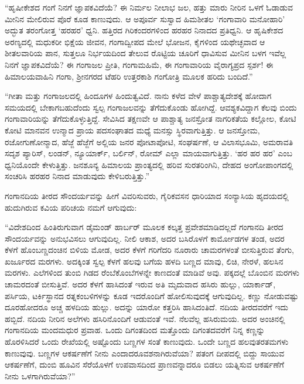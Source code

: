  “ಹೃಷೀಕೇಶದ ಗಂಗೆ ನಿನಗೆ ಜ್ಞಾಪಕವಿದೆಯೆ? ಈ ನಿರ್ಮಲ ನೀಲಾಭ ಜಲ, ಹತ್ತು ಮಾರು ನೀರಿನ ಒಳಗೆ ಓಡಾಡುವ ಮೀನಿನ ಮೇಲಿರುವ ಪೊರೆ ಕೂಡ ಕಾಣುವುದು. ಆ ಅಪೂರ್ವ ಸುಸ್ವಾದ ಹಿಮಶೀತಲ ‘ಗಂಗಾವಾರಿ ಮನೋಹಾರಿ’ ಅದ್ಭುತ ತರಂಗೋತ್ತ ‘ಹರಹರ’ ಧ್ವನಿ. ಹತ್ತಿರದ ಗಿರಿಕಂದರಗಳಿಂದ ಹರಹರ ನಿನಾದದ ಪ್ರತಿಧ್ವನಿ. ಆ ಹೃಷಿಕೇಶದ ಅರಣ್ಯದಲ್ಲಿ ಮಧುಕರೀ ಭಿಕ್ಷೆಯ ಜೀವನ, ಗಂಗಾದ್ವೀಪದ ಮೇಲೆ ಭೋಜನ, ಕೈಗಳಿಂದ ಯಥೇಚ್ಛವಾದ ಆ ಶೀತಲವಾರಿಯ ಪಾನ, ಸುತ್ತಲೂ ನಿರ್ಭಯದಿಂದ ತೇಲುವ ರೊಟ್ಟಿಯ ಚೂರಿಗೆ ಧಾವಿಸುವ ಮೀನಿನ ಬಳಗ ಇವೆಲ್ಲ ನಿನಗೆ ಜ್ಞಾಪಕವಿದೆಯೆ? ಈ ಗಂಗಾಜಲ ಪ್ರೀತಿ, ಗಂಗಾಮಹಿಮೆ, ಈ ಗಂಗಾವಾರಿಯ ವೈರಾಗ್ಯಪ್ರದ ಸ್ಪರ್ಶ! ಈ ಹಿಮಾಲಯವಾಹಿನಿ ಗಂಗಾ, ಶ‍್ರೀನಗರದ ಟೆಹರಿ ಉತ್ತರಕಾಶಿ ಗಂಗೋತ್ರಿ ಮೂಲಕ ಹರಿದು ಬಂದಿದೆ.” 

 “ಗೀತಾ ಮತ್ತು ಗಂಗಾಜಲದಲ್ಲಿ ಹಿಂದೂಗಳ ಹಿಂದುತ್ವವಿದೆ. ನಾನು ಕಳೆದ ವೇಳೆ ಪಾಶ್ಚಾತ್ಯದೇಶಕ್ಕೆ ಹೋದಾಗ ಸಮಯದಲ್ಲಿ ಬೇಕಾಗಬಹುದೆಂದು ಸ್ವಲ್ಪ ಗಂಗಾಜಲವನ್ನು ತೆಗೆದುಕೊಂಡು ಹೋಗಿದ್ದೆ. ಆವಶ್ಯಕವಿದ್ದಾಗ ಕೆಲವು ಬಿಂದು ಗಂಗಾವಾರಿಯನ್ನು ತೆಗೆದುಕೊಳ್ಳುತ್ತಿದ್ದೆ. ಸೇವಿಸಿದ ತಕ್ಷಣವೇ ಆ ಪಾಶ್ಚಾತ್ಯ ಜನಸ್ರೋತ ನಾಗರಿಕತೆಯ ಕಲ್ಲೋಲ, ಕೋಟಿ ಕೋಟಿ ಮಾನವನ ಉನ್ಮಾದ ಪ್ರಾಯ ಪದಸಂಘಾತದ ಮಧ್ಯೆ ಮನಸ್ಸು ಸ್ಥಿರವಾಗುತ್ತಿತ್ತು. ಆ ಜನಸ್ತೋಮ, ರಜೋಗುಣೋನ್ಮಾದ, ಹೆಜ್ಜೆ ಹೆಜ್ಜೆಗೆ ಅಲ್ಲಿಯ ಜನರ ಪೋಟಾಪೋಟಿ, ಸಂಘರ್ಷಣೆ, ಆ ವಿಲಾಸಭೂಮಿ, ಅಮರಾವತಿ ಸದೃಶ ಪ್ಯಾರಿಸ್, ಲಂಡನ್, ನ್ಯೂಯಾರ್ಕ್, ಬರ್ಲಿನ್, ರೋಮ್ ಎಲ್ಲಾ ಮಾಯವಾಗುತ್ತಿತ್ತು. ‘ಹರ ಹರ ಹರ’ ಎಂಬ ಧ್ವನಿಯೊಂದೇ ಕೇಳುತ್ತಿತ್ತು. ಜನಶೂನ್ಯ ಹಿಮಾಲಯ ಪ್ರಾಂತ್ಯದಲ್ಲಿ ಹರಿವ ಸುರತರಿಂಗಿನಿ, ದೇಹದ ಅಂಗೋಪಾಂಗದಲ್ಲಿ ಸಂಚರಿಸಿ ಹರಹರ ನಿನಾದ ಮಾಡುವುದು ಕೇಳಿಬರುತ್ತಿತ್ತು.” 

 ಗಂಗಾನದಿಯ ತೀರದ ಸೌಂದರ್ಯವನ್ನು ಹೀಗೆ ವಿವರಿಸುವರು, ಗೈರಿಕವಸನ ಧಾರಿಯಾದ ಸಂನ್ಯಾಸಿಯ ಹೃದಯದಲ್ಲಿ ಹುದುಗಿರುವ ಕವಿಯ ಪರಿಚಯ ನಮಗೆ ಆಗುವುದು: 

 “ವಿದೇಶದಿಂದ ಹಿಂತಿರುಗುವಾಗ ಡೈಮಂಡ್ ಹಾರ್ಬರ್ ಮೂಲಕ ಕಲ್ಕತ್ತ ಪ್ರವೇಶಮಾಡಿದಲ್ಲದೆ ಗಂಗಾನದಿ ತೀರದ ಸೌಂದರ್ಯವನ್ನು ಅನುಭವಿಸಲು ಆಗುವುದಿಲ್ಲ. ನೀಲಿ ಆಕಾಶ, ಅದರ ಬಸಿರೊಳಗೆ ಕಾರ್ಮೋಡಗಳ ತಂಡ, ಅದರ ಕೆಳಗೆ ಹೊಂಬಣ್ಣದಂಚಿನ ಬಿಳಿಯ ಮೋಡ, ಅದರ ಕೆಳಗೆ ಗರಿಗೆದರಿ ನೂರಾರು ಚಾಮರಗಳಂತೆ ಬೀಸುತ್ತಿರುವ ತೆಂಗು, ಖರ್ಜೂರದ ಮರಗಳು. ಅದಕ್ಕಿಂತ ಸ್ವಲ್ಪ ಕೆಳಗೆ ಹಲವು ಬಗೆಯ ಹಳದಿ ಬಣ್ಣದ ಮಾವು, ಲಿಚಿ, ನೇರಳೆ, ಹಲಸಿನ ಮರಗಳು. ಎಲೆಗಳಿಂದ ತುಂಬಿ ಗಿಡದ ರೆಂಬೆಕೊಂಬೆಗಳನ್ನೇ ಕಾಣದಂತೆ ಮಾಡಿವೆ ಅವು. ಪಕ್ಕದಲ್ಲೆ ಬೊಂಬಿನ ಮರಗಳು ಚಾಮರದಂತೆ ಬೀಸುತ್ತಿವೆ. ಅದರ ಕೆಳಗೆ ಹಾಸಿದಂತೆ ಇರುವ ಅತಿ ಮೃದುವಾದ ಹಸಿರು ಹುಲ್ಲು, ಯಾರ್ಕಾಡ್, ಪರ್ಸಿಯ, ಟರ್ಕಿಸ್ಥಾನದ ರತ್ನಕಂಬಳಿಗಳನ್ನು ಕೂಡ ಇದರೊಂದಿಗೆ ಹೋಲಿಸುವುದಕ್ಕೆ ಆಗುವುದಿಲ್ಲ. ಕಣ್ಣು ನೋಡುವಷ್ಟು ದೂರಹೋದರೂ ಅಚ್ಚ ಹಳದಿಯ ಹುಲ್ಲು. ಅದನ್ನು ಯಾರೋ ಕತ್ತರಿಸಿ ಹಾಸಿದಂತಿದೆ. ನದಿಯ ತೀರದವರೆಗೆ ಇದು ಹಬ್ಬಿದೆ. ನದಿಯ ನೀರಿನ ಅಲೆಗಳು ಹಸಿರಿನೊಂದಿಗೆ ಆಡುವಂತೆ ಇವೆ. ನೆಲವೆಲ್ಲ ಹಸಿರುಮಯ. ಅದರ ಅಂಚಿನಲ್ಲಿ ಗಂಗಾನದಿಯ ಮಂದಮಧುರ ಪ್ರವಾಹ. ಒಂದು ದಿಗಂತದಿಂದ ಮತ್ತೊಂದು ದಿಗಂತದವರೆಗೆ ನಿನ್ನ ಕಣ್ಣನ್ನು ಹೊರಳಿಸಿದರೆ ಒಂದು ರೇಖೆಯಲ್ಲಿ ಅಷ್ಟೊಂದು ಬಣ್ಣಗಳ ಸಂತೆ ಕಾಣುವುದು. ಒಂದೇ ಬಣ್ಣದ ಹಲವು\break ತರತಮಗಳು ಕಾಣುವುವು. ಬಣ್ಣಗಳ ಆಕರ್ಷಣೆಗೆ ನೀನು ಎಂದಾದರೂ\break ವಶನಾಗಿರುವೆಯಾ? ಪತಂಗ ದೀಪದಲ್ಲಿ ಬಿದ್ದು ಸಾಯುವ ಆಕರ್ಷಣೆಗೆ, ದುಂಬಿ ಹೂವಿನ ಸೆರೆಯೊಳಗೆ ಉಪವಾಸದಿಂದ ಪ್ರಾಣವನ್ನಾದರೂ ಬಿಡಲು ಯತ್ನಿಸುವ ಆಕರ್ಷಣೆಗೆ ನೀನು ಒಳಗಾಗಿರುವೆಯಾ?” 

